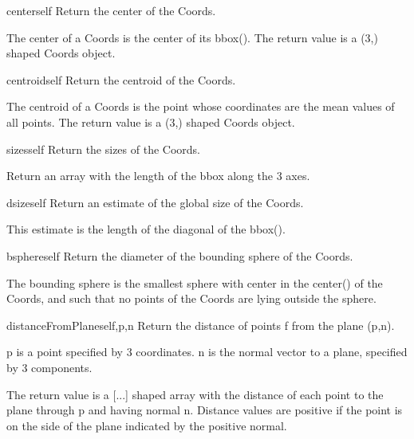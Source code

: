 \begin{funcdesc}{center}{self}
Return the center of the Coords.

        The center of a Coords is the center of its bbox().
        The return value is a (3,) shaped Coords object.
        
\end{funcdesc}

\begin{funcdesc}{centroid}{self}
Return the centroid of the Coords.

        The centroid of a Coords is the point whose coordinates
        are the mean values of all points.
        The return value is a (3,) shaped Coords object.
        
\end{funcdesc}

\begin{funcdesc}{sizes}{self}
Return the sizes of the Coords.

        Return an array with the length of the bbox along the 3 axes.
        
\end{funcdesc}

\begin{funcdesc}{dsize}{self}
Return an estimate of the global size of the Coords.

        This estimate is the length of the diagonal of the bbox().
\end{funcdesc}

\begin{funcdesc}{bsphere}{self}
Return the diameter of the bounding sphere of the Coords.

        The bounding sphere is the smallest sphere with center in the
        center() of the Coords, and such that no points of the Coords
        are lying outside the sphere.
        
\end{funcdesc}

\begin{funcdesc}{distanceFromPlane}{self,p,n}
Return the distance of points f from the plane (p,n).

        p is a point specified by 3 coordinates.
        n is the normal vector to a plane, specified by 3 components.

        The return value is a [...] shaped array with the distance of
        each point to the plane through p and having normal n.
        Distance values are positive if the point is on the side of the
        plane indicated by the positive normal.
        
\end{funcdesc}


